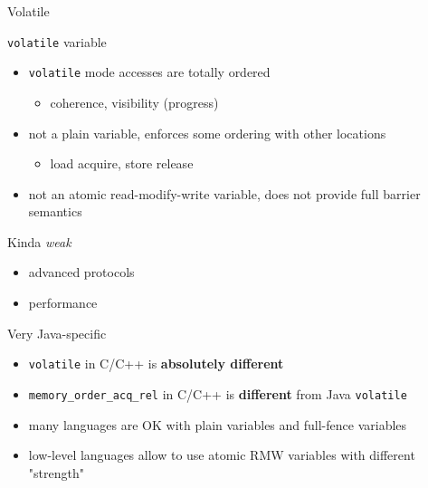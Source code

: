 \begin{frame}[t,fragile]{Volatile}

\texttt{volatile} variable
\begin{itemize}
  \item \texttt{volatile} mode accesses are totally ordered
  \begin{itemize}
    \item coherence, visibility (progress)
  \end{itemize}
  \item not a plain variable, enforces some ordering with other locations 
  \begin{itemize}
    \item load acquire, store release
  \end{itemize}
  \item not an atomic read-modify-write variable, does not provide full barrier semantics
\end{itemize}

\pause
Kinda \textit{weak}
\begin{itemize}
  \item advanced protocols
  \item performance
\end{itemize}

\pause

Very Java-specific
\begin{itemize}
  \item \texttt{volatile} in C/C++ is \textbf{absolutely different}
  \item \texttt{memory\_order\_acq\_rel} in C/C++ is \textbf{different} from Java \texttt{volatile}
  \item many languages are OK with plain variables and full-fence variables
  \item low-level languages allow to use atomic RMW variables with different "strength"  
\end{itemize}

\end{frame}



